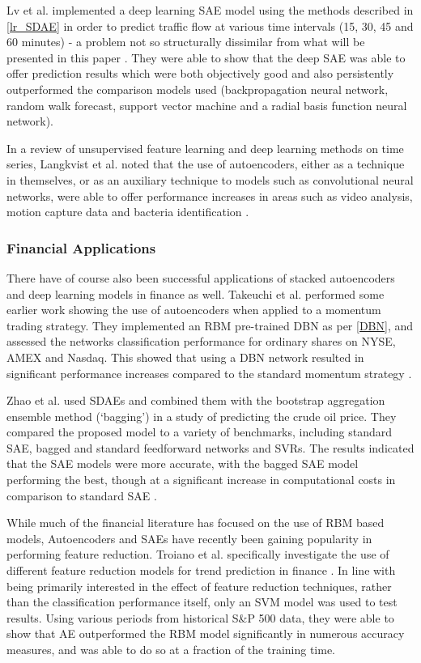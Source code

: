 \documentclass[a4paper,11pt,oneside]{article}
\theoremstyle{plain}
\theoremstyle{definition}
\begin{document}
	Lv et al.  implemented a deep learning SAE model using the methods described in \ref{lr_SDAE} in order to 
	predict traffic flow at various time intervals (15, 30, 45 and 60 minutes) - a problem not so structurally dissimilar 
	from what will be presented in this paper \cite{Lv}. They were able to show that the deep SAE was able to offer prediction 
	results which were both objectively good and also persistently outperformed the comparison models used 
	(backpropagation neural network, random walk forecast, support vector machine and a radial basis function 
	neural network).
	\hfill \break 
	
	In a review of unsupervised feature learning and deep learning methods on time series, Langkvist et al. noted that 
	the use of autoencoders, either as a technique in themselves, or as an auxiliary technique to models 
	such as convolutional neural networks, were able to offer performance increases in areas such as video analysis, 
	motion capture data and bacteria identification \cite{Langkvist}.
	
	\subsubsection{Financial Applications}
	
	There have of course also been successful applications of stacked autoencoders and deep learning models in 
	finance as well. Takeuchi et al. performed some earlier work showing the use of autoencoders when applied to a 
	momentum trading strategy. They implemented an RBM pre-trained DBN as per \ref{DBN}, and assessed the 
	networks classification performance for ordinary shares on NYSE, AMEX and Nasdaq. This showed that using a 
	DBN network resulted in significant performance increases compared to the standard momentum strategy \cite{Takeuchi}.
	\hfill \break 
	
	Zhao et al. used SDAEs and combined them with the bootstrap aggregation ensemble method (‘bagging’) in a 
	study of predicting the crude oil price. They compared the proposed model to a variety of benchmarks, including 
	standard SAE, bagged and standard feedforward networks and SVRs. The results indicated that the SAE models 
	were more accurate, with the bagged SAE model performing the best, though at a significant increase in 
	computational costs in comparison to standard SAE \cite{Zhao}.
	\hfill \break 
	
	While much of the financial literature has focused on the use of RBM based models, Autoencoders and SAEs have 
	recently been gaining popularity in performing feature reduction. Troiano et al. specifically investigate the use of 
	different feature reduction models for trend prediction in finance \cite{Troiano}. In line with being primarily 
	interested in the effect of feature reduction techniques, rather than the classification performance itself, only an 
	SVM model was used to test results. Using various periods from historical S\&P 500 data, they were able to show 
	that AE outperformed the RBM model significantly in numerous accuracy measures, and was able to do so at a 
	fraction of the training time.
	\hfill \break 
	
\end{document}

